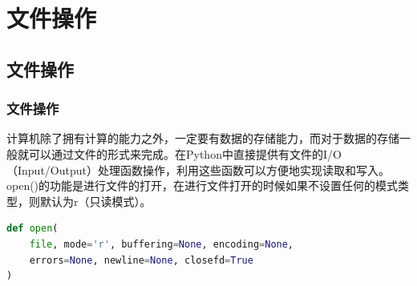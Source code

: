 \chapter{文件操作}

\section{文件操作}

\subsection{文件操作}

计算机除了拥有计算的能力之外，一定要有数据的存储能力，而对于数据的存储一般就可以通过文件的形式来完成。在Python中直接提供有文件的I/O（Input/Output）处理函数操作，利用这些函数可以方便地实现读取和写入。\\

open()的功能是进行文件的打开，在进行文件打开的时候如果不设置任何的模式类型，则默认为r（只读模式）。

\vspace{-0.5cm}

\begin{lstlisting}[language=Python]
def open(
    file, mode='r', buffering=None, encoding=None,
    errors=None, newline=None, closefd=True
)
\end{lstlisting}

\begin{table}[H]
	\centering
	\caption{文件打开模式}
\end{table}

